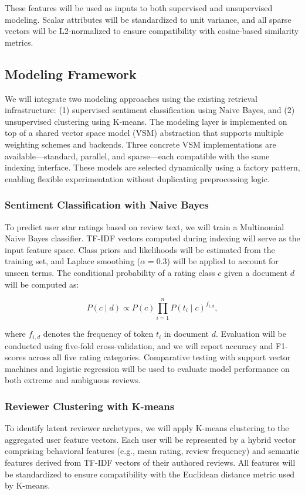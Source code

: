 These features will be used as inputs to both supervised and unsupervised modeling. Scalar attributes will be standardized to unit variance, and all sparse vectors will be L2-normalized to ensure compatibility with cosine-based similarity metrics.

\subsection{Modeling Framework}
We will integrate two modeling approaches using the existing retrieval infrastructure: (1) supervised sentiment classification using Naive Bayes, and (2) unsupervised clustering using K-means. The modeling layer is implemented on top of a shared vector space model (VSM) abstraction that supports multiple weighting schemes and backends. Three concrete VSM implementations are available—standard, parallel, and sparse—each compatible with the same indexing interface. These models are selected dynamically using a factory pattern, enabling flexible experimentation without duplicating preprocessing logic.

\subsubsection{Sentiment Classification with Naive Bayes}
To predict user star ratings based on review text, we will train a Multinomial Naive Bayes classifier. TF-IDF vectors computed during indexing will serve as the input feature space. Class priors and likelihoods will be estimated from the training set, and Laplace smoothing (\( \alpha = 0.3 \)) will be applied to account for unseen terms. The conditional probability of a rating class \( c \) given a document \( d \) will be computed as:

\[
P(c \mid d) \propto P(c) \prod_{i=1}^{n} P(t_i \mid c)^{f_{i,d}},
\]

where \( f_{i,d} \) denotes the frequency of token \( t_i \) in document \( d \). Evaluation will be conducted using five-fold cross-validation, and we will report accuracy and F1-scores across all five rating categories. Comparative testing with support vector machines and logistic regression will be used to evaluate model performance on both extreme and ambiguous reviews.

\subsubsection{Reviewer Clustering with K-means}
To identify latent reviewer archetypes, we will apply K-means clustering to the aggregated user feature vectors. Each user will be represented by a hybrid vector comprising behavioral features (e.g., mean rating, review frequency) and semantic features derived from TF-IDF vectors of their authored reviews. All features will be standardized to ensure compatibility with the Euclidean distance metric used by K-means.


